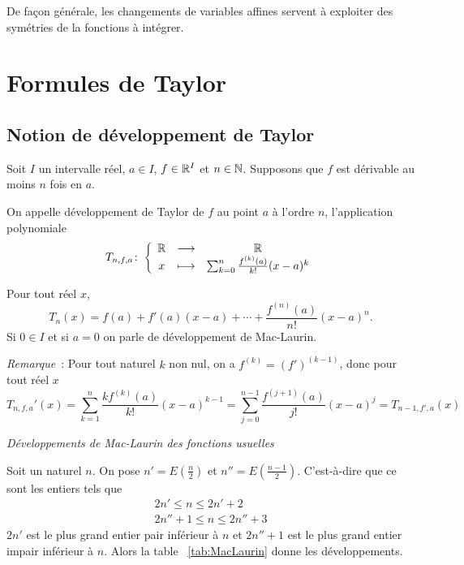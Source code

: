 De façon générale, les changements de variables affines servent à exploiter des symétries de la fonctions à intégrer.

\section{Formules de Taylor}

\subsection{Notion de développement de Taylor}

\begin{defdef}
  Soit \(I\) un intervalle réel, \(a \in I\), \(f \in \mathbb{R}^I\) et \(n \in \mathbb{N}\). Supposons que \(f\) est dérivable au moins \(n\) fois en \(a\).

On appelle développement de Taylor de \(f\) au point \(a\) à l'ordre \(n\), l'application polynomiale
\begin{equation}
  T_{n,f,a}\colon \left\{\begin{array}{ccc} \mathbb{R} & \longrightarrow &\mathbb{R}\\ x & \longmapsto & \sum_{k=0}^n \frac{f^{(k)}(a)}{k!}(x-a)^k \end{array} \right.
\end{equation}

Pour tout réel \(x\),
\begin{equation}
  T_{n}(x)= f(a) + f'(a)(x-a) + \dotsb +\frac{f^{(n)}(a)}{n!}(x-a)^n.
\end{equation}
Si \(0 \in I\) et si \(a=0\) on parle de développement de Mac-Laurin. 
\end{defdef}

\emph{Remarque}~: Pour tout naturel \(k\) non nul, on a \(f^{(k)} = (f')^{(k-1)}\), donc pour tout réel \(x\)
\begin{equation}
  T_{n,f,a}'(x)=\sum_{k=1}^n \frac{k f^{(k)}(a)}{k!}(x-a)^{k-1} = \sum_{j=0}^{n-1} \frac{f^{(j+1)}(a)}{j!}(x-a)^j = T_{n-1,f',a}(x)
\end{equation}

\emph{Développements de Mac-Laurin des fonctions usuelles}

Soit un naturel \(n\). On pose \(n'=E\left(\frac{n}{2}\right)\) et \(n''=E\left(\frac{n-1}{2}\right)\). C'est-à-dire que ce sont les entiers tels que
\begin{align}
  2n' \leqslant n \leqslant 2n'+2 \\
  2n'' +1 \leqslant n \leqslant 2n''+3
\end{align}
\(2n'\) est le plus grand entier pair inférieur à \(n\) et \(2n''+1\) est le plus grand entier impair inférieur à \(n\). Alors la table~
\ref{tab:MacLaurin} donne les développements.

